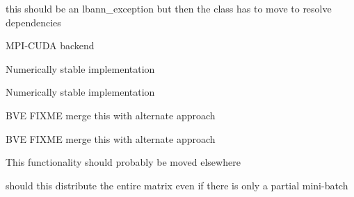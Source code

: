 
\begin{DoxyRefList}
\item[\label{todo__todo000015}%
\Hypertarget{todo__todo000015}%
Member \hyperlink{base_8hpp_adeeaddd10bd31df0cae7cb0fcae45d5c}{\+\_\+to\+\_\+string} (execution\+\_\+mode m)]this should be an lbann\+\_\+exception but then the class has to move to resolve dependencies  
\item[\label{todo__todo000016}%
\Hypertarget{todo__todo000016}%
Member \hyperlink{namespacelbann_1_1Al_acac3d42323b313e89a60a27f00554661}{lbann\+:\+:Al\+:\+:nccl\+\_\+backend} ]M\+P\+I-\/\+C\+U\+DA backend  
\item[\label{todo__todo000008}%
\Hypertarget{todo__todo000008}%
Member \hyperlink{namespacelbann_a085b697db535c10a6fd6689cc4445bd4}{lbann\+:\+:columnwise\+\_\+mean\+\_\+and\+\_\+stdev} (const Abs\+Dist\+Mat \&data, Abs\+Dist\+Mat \&means, Abs\+Dist\+Mat \&stdevs)]Numerically stable implementation  
\item[\label{todo__todo000007}%
\Hypertarget{todo__todo000007}%
Member \hyperlink{namespacelbann_ab043d2f2f9dea0ee861aff3a38216b24}{lbann\+:\+:columnwise\+\_\+sums\+\_\+and\+\_\+sqsums} (const Abs\+Dist\+Mat \&data, Abs\+Dist\+Mat \&sums, Abs\+Dist\+Mat \&sqsums)]Numerically stable implementation  
\item[\label{todo__todo000019}%
\Hypertarget{todo__todo000019}%
Member \hyperlink{classlbann_1_1generic__data__reader_a06fb58d1c0b84b8c76f5b4d160751f34}{lbann\+:\+:generic\+\_\+data\+\_\+reader\+:\+:get\+\_\+num\+\_\+iterations\+\_\+per\+\_\+epoch} () const]B\+VE F\+I\+X\+ME merge this with alternate approach  
\item[\label{todo__todo000018}%
\Hypertarget{todo__todo000018}%
Member \hyperlink{classlbann_1_1generic__data__reader_a91573d9599b503a6bdf2939e69659e8b}{lbann\+:\+:generic\+\_\+data\+\_\+reader\+:\+:set\+\_\+num\+\_\+iterations\+\_\+per\+\_\+epoch} (int num\+\_\+iterations\+\_\+per\+\_\+epoch)]B\+VE F\+I\+X\+ME merge this with alternate approach  
\item[\label{todo__todo000020}%
\Hypertarget{todo__todo000020}%
Member \hyperlink{classlbann_1_1generic__input__layer_ad0b8ea79bc508bd227e08124359531c8}{lbann\+:\+:generic\+\_\+input\+\_\+layer\+:\+:fp\+\_\+setup\+\_\+data} (int mini\+\_\+batch\+\_\+size) override]This functionality should probably be moved elsewhere  
\item[\label{todo__todo000023}%
\Hypertarget{todo__todo000023}%
Member \hyperlink{classlbann_1_1generic__target__layer_a57a60f5a28c9fb78d5151801123d4dba}{lbann\+:\+:generic\+\_\+target\+\_\+layer\+:\+:fp\+\_\+compute} () override]should this distribute the entire matrix even if there is only a partial mini-\/batch  

\end{DoxyRefList}
